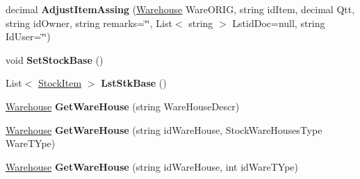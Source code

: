 \begin{DoxyCompactItemize}
decimal {\bfseries Adjust\+Item\+Assing} (\mbox{\hyperlink{class_h_k_supply_1_1_p_r_j___stocks_1_1_classes_1_1_stocks_1_1_warehouse}{Warehouse}} Ware\+O\+R\+IG, string id\+Item, decimal Qtt, string id\+Owner, string remarks=\char`\"{}\char`\"{}, List$<$ string $>$ Lstid\+Doc=null, string Id\+User=\char`\"{}\char`\"{})
\item 
\mbox{\label{class_h_k_supply_1_1_p_r_j___stocks_1_1_classes_1_1_stocks_a01519953043fea14eccef7449ec8f584}} 
void {\bfseries Set\+Stock\+Base} ()
\item 
\mbox{\label{class_h_k_supply_1_1_p_r_j___stocks_1_1_classes_1_1_stocks_ad57faa95276e30fae2edf12fdcab29e5}} 
List$<$ \mbox{\hyperlink{class_h_k_supply_1_1_p_r_j___stocks_1_1_classes_1_1_stocks_1_1_stock_item}{Stock\+Item}} $>$ {\bfseries Lst\+Stk\+Base} ()
\item 
\mbox{\label{class_h_k_supply_1_1_p_r_j___stocks_1_1_classes_1_1_stocks_a9be7b6fe1ff5a2e61cba109cf23315e4}} 
\mbox{\hyperlink{class_h_k_supply_1_1_p_r_j___stocks_1_1_classes_1_1_stocks_1_1_warehouse}{Warehouse}} {\bfseries Get\+Ware\+House} (string Ware\+House\+Descr)
\item 
\mbox{\label{class_h_k_supply_1_1_p_r_j___stocks_1_1_classes_1_1_stocks_a9540d96f6fcd4d11994bf48e850d2bf7}} 
\mbox{\hyperlink{class_h_k_supply_1_1_p_r_j___stocks_1_1_classes_1_1_stocks_1_1_warehouse}{Warehouse}} {\bfseries Get\+Ware\+House} (string id\+Ware\+House, Stock\+Ware\+Houses\+Type Ware\+T\+Ype)
\item 
\mbox{\label{class_h_k_supply_1_1_p_r_j___stocks_1_1_classes_1_1_stocks_a7e2a15814fded08f3adbae46bce216f8}} 
\mbox{\hyperlink{class_h_k_supply_1_1_p_r_j___stocks_1_1_classes_1_1_stocks_1_1_warehouse}{Warehouse}} {\bfseries Get\+Ware\+House} (string id\+Ware\+House, int id\+Ware\+T\+Ype)
\item 
\mbox{\label{class_h_k_supply_1_1_p_r_j___stocks_1_1_classes_1_1_stocks_a7c76db3b61206d0bdbbfcfc2dd8e9b20}} 

\end{DoxyCompactItemize}
